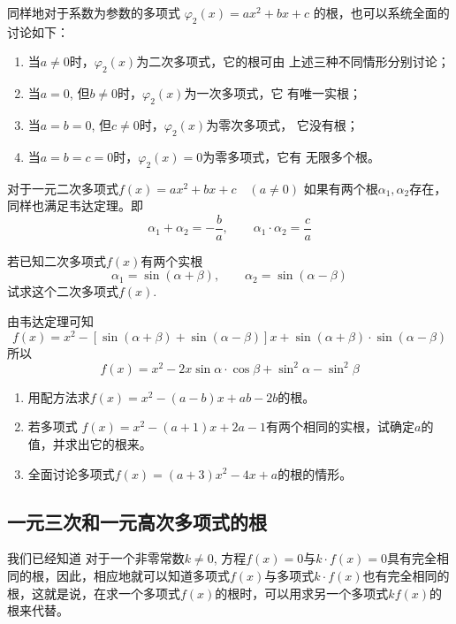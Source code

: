 同样地对于系数为参数的多项式
$\varphi_2 (x) =ax^2+bx+c$
的根，也可以系统全面的讨论如下：

\begin{enumerate}
\item 当$a\ne 0$时，$\varphi_2(x)$为二次多项式，它的根可由
上述三种不同情形分别讨论；
\item 当$a=0$, 但$b\ne 0$时，$\varphi_2(x)$为一次多项式，它
有唯一实根；
\item 当$a=b=0$, 但$c\ne 0$时，$\varphi_2(x)$为零次多项式，
它没有根；
\item 当$a=b=c=0$时，$\varphi_2(x)=0$为零多项式，它有
无限多个根。
\end{enumerate}

对于一元二次多项式$f (x) =ax^2+bx+c\quad  (a\ne 0)$
如果有两个根$\alpha_1,\alpha_2$存在，同样也满足韦达定理。即
\[\alpha_1+\alpha_2=-\frac{b}{a},\qquad \alpha_1\cdot \alpha_2=\frac{c}{a}\]

\begin{example}
    若已知二次多项式$f(x)$有两个实根
  \[  \alpha_1 =\sin (\alpha+\beta) ,\qquad  \alpha_2=\sin (\alpha-\beta) \]
    试求这个二次多项式$f(x)$.
\end{example}

\begin{solution}
    由韦达定理可知
\[f(x)=x^2-[\sin (\alpha+\beta) +\sin (\alpha-\beta) ]x+\sin (\alpha+\beta) \cdot \sin (\alpha-\beta) \]
所以
\[f(x)=x^2-2x\sin\alpha\cdot \cos\beta+\sin^2\alpha-\sin^2\beta\]
\end{solution}

\begin{ex}
\begin{enumerate}
    \item 用配方法求$f(x)=x^2-(a-b)x+ab-2b$的根。
    \item 若多项式
$f (x) =x^2- (a+1) x+2a-1$有两个相同的实根，试确定$a$的值，并求出它的根来。
\item 全面讨论多项式$f(x)=(a+3)x^2-4x+a$的根的情形。
\end{enumerate}
\end{ex}

\subsection{一元三次和一元高次多项式的根}
我们已经知道
对于一个非零常数$k\ne 0$, 方程$f(x)=0$与$k\cdot f(x)=0$具有完全相同的根，因此，相应地就可以知道多项式$f(x)$与多项式$k\cdot f(x)$也有完全相同的根，这就是说，在求一个多项式$f(x)$的根时，可以用求另一个多项式$kf(x)$的根来代替。

